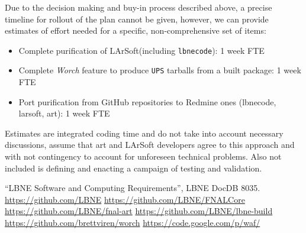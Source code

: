 \documentclass[usletter]{article}
\newcommand{\code}[1]{\texttt{#1}}
\newcommand{\worch}{\textit{Worch}\xspace}
\newcommand{\ups}{\code{UPS}\xspace}
\newcommand{\art}{art\xspace}
\newcommand{\larsoft}{LArSoft\xspace}
\newcommand{\lbnecode}{\code{lbnecode}\xspace}
\begin{document}
Due to the decision making and buy-in process described above, a
precise timeline for rollout of the plan cannot be given, however, we can provide  estimates
of effort needed for a specific, non-comprehensive set of items:
\begin{itemize}
	\item Complete purification of \larsoft (including \lbnecode): 1 week FTE
	\item Complete \worch feature to produce \ups tarballs from a built package:
  1 week FTE
	\item Port purification from GitHub repositories to Redmine ones
  (lbnecode, larsoft, art): 1 week FTE
\end{itemize}

Estimates are integrated coding time and do not take into account
necessary discussions, assume that \art and \larsoft developers
agree to this approach and with not contingency to account for
unforeseen technical problems.  Also not included is defining and
enacting a campaign of testing and validation.

\begin{thebibliography}{99}
 ``LBNE Software and Computing Requirements'', LBNE DocDB 8035.
 \url{https://github.com/LBNE}
 \url{https://github.com/LBNE/FNALCore}
 \url{https://github.com/LBNE/fnal-art}
 \url{https://github.com/LBNE/lbne-build}
 \url{https://github.com/brettviren/worch}
 \url{https://code.google.com/p/waf/}
\end{thebibliography}
\end{document}
